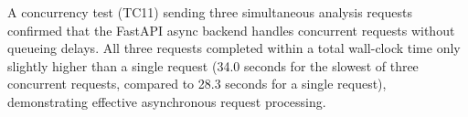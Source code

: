A concurrency test (TC11) sending three simultaneous analysis requests confirmed that the FastAPI async backend handles concurrent requests without queueing delays. All three requests completed within a total wall-clock time only slightly higher than a single request (34.0 seconds for the slowest of three concurrent requests, compared to 28.3 seconds for a single request), demonstrating effective asynchronous request processing.

